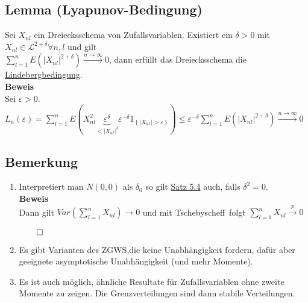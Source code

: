 \documentclass[german,10pt,oneside, fleqn, a4paper]{article}
\newcommand{\tscheb}{Tschebyscheff}
\newcommand{\ra}{\rightarrow}
\newcommand{\sm}[2][\infty]{\sum\limits_{#2}^{#1}}
\newcommand{\brc}[1]{\left(#1\right)}
\newcommand{\brac}[1]{\left\lbrace #1\right\rbrace}
\newcommand{\QED}{\begin{flushright}$\qed$\end{flushright}}
\newcommand{\mc}[1]{\mathcal{#1}}
\newcommand{\lp}[1]{\mc{L}^{#1}}
\newcommand{\beweis}{\textbf{Beweis}\\}
\newcommand{\toinf}{\rightarrow\infty}
\newcommand{\1}[1]{1_{#1}}
\newcommand{\2}[1]{\1{\brac{#1}}}
\newcommand{\xr}[2][]{\xrightarrow[#1]{#2}}
\begin{document}
\subsection{Lemma (Lyapunov-Bedingung)}
\label{5.7}
Sei $X_{nl}$ ein Dreiecksschema von Zufallsvariablen. Existiert ein $\delta>0$ mit $X_{nl}\in\lp{2+\delta}\forall n,l$ und gilt\\
$\sm[n]{l=1}E\brc{\vert X_{nl}\vert^{2+\delta}}\xr{n\toinf}0$, dann erfüllt das Dreiecksschema die \hyperref[5.4]{Lindebergbedingung}.\\
\beweis
Sei $\varepsilon>0$.\\
$L_n(\varepsilon)=\sm[n]{l=1}E(X_{nl}^2\underbrace{\varepsilon^\delta}_{<|X_{nl}|^\delta}\varepsilon^{-\delta}\1{\brac{|X_{n1}|>\varepsilon}})\leq\varepsilon^{-\delta}\sm[n]{l=1}E\brc{|X_{nl}|^{2+\delta}}\xr{n\toinf}0$

\subsection{Bemerkung}
\label{5.8}
\begin{enumerate}[label=(\alph*)]
\item Interpretiert man $N(0,0)$ als $\delta_0$ so gilt \hyperref[5.4]{Satz 5.4} auch, falls $\delta^2=0$.\\
\beweis
Dann gilt $Var\brc{\sm[n]{l=1}X_{nl}}\ra 0$ und mit \tscheb \ folgt $\sm[n]{l=1}X_{nl}\xr{p}0$\QED
\item Es gibt Varianten des ZGWS,die keine Unabhängigkeit fordern, dafür aber geeignete asymptotische Unabhängigkeit (und mehr Momente).
\item Es ist auch möglich, ähnliche Resultate für Zufallsvariablen ohne zweite Momente zu zeigen. Die Grenzverteilungen sind dann stabile Verteilungen.
\end{enumerate}
\end{document}
